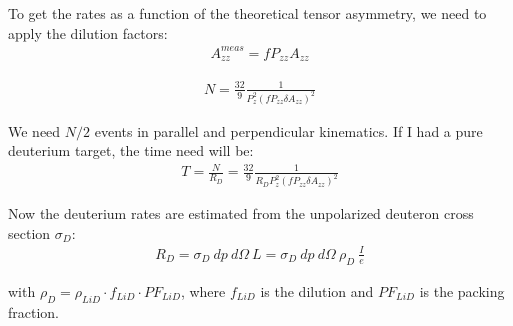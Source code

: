 \documentclass[11pt]{article}
\begin{document}
To get the rates as a function of the theoretical tensor asymmetry, we need to apply the dilution factors:
\begin{eqnarray}
A_{zz}^{meas} = f P_{zz} A_{zz}
\label{none} 
\end{eqnarray}

\begin{eqnarray}
N = \frac{32}{9} \frac{1}{P_z^2 (f P_{zz} \delta A_{zz})^2}
\label{none} 
\end{eqnarray}

We need $N/2$ events in parallel and perpendicular kinematics. If I had a pure deuterium target, the time need will be:
\begin{eqnarray}
T = \frac{N}{R_D} = \frac{32}{9} \frac{1}{R_D P_z^2 (f P_{zz} \delta A_{zz})^2}
\label{none} 
\end{eqnarray}

Now the deuterium rates are estimated from the unpolarized deuteron cross section $\sigma_D$:
\begin{eqnarray}
 R_D = \sigma_D~dp~d\Omega~L = \sigma_D~dp~d\Omega~\rho_D~\frac{I}{e}
\label{none} 
\end{eqnarray}

with $\rho_D = \rho_{LiD} \cdot f_{LiD} \cdot PF_{LiD}$, where $f_{LiD}$ is the dilution and $PF_{LiD}$ is the packing fraction.




%








\end{document}
